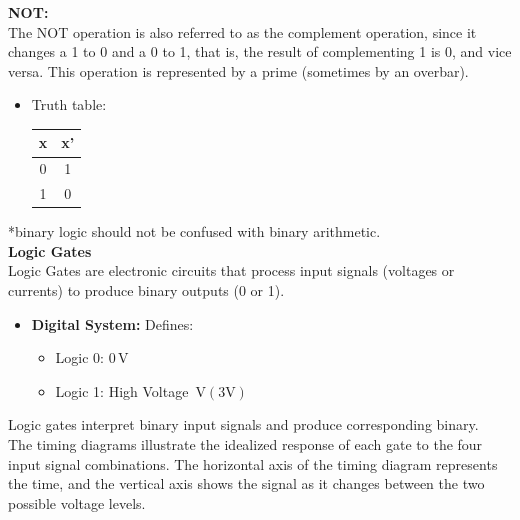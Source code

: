 \documentclass[a4paper,12pt]{article}
\begin{document}
\textbf{NOT:}\\[10pt]
The NOT operation is also referred to as the complement operation, since it changes a 1 to 0 and a 0 to 1, that is, the result of complementing 1 is 0, and vice versa. This operation is represented by a prime (sometimes by an overbar).
\begin{itemize}
        \item Truth table:
        \begin{tabular}{|c|c|}
        \hline
        x & x' \\
        \hline
        0 & 1 \\
        \hline
        1 & 0 \\
        \hline
        \end{tabular}
\end{itemize}
*binary logic should not be confused with binary arithmetic.\\[10pt]
\textbf{Logic Gates}\\[10pt]
Logic Gates are electronic circuits that process input signals (voltages or currents) to produce binary outputs (0 or 1).
\begin{itemize}
    \item \textbf{Digital System:} Defines:
    \begin{itemize}
        \item Logic 0: $0 \, \text{V}$
        \item Logic 1: High Voltage $ \, \text{V}(3 \text{V})$
    \end{itemize}
\end{itemize}
Logic gates interpret binary input signals and produce corresponding binary. \\
The timing diagrams illustrate the idealized response of each gate to the
four input signal combinations. The horizontal axis of the timing diagram represents the time, and the vertical axis shows the signal as it changes between the two possible
voltage levels.\\
\end{document}
